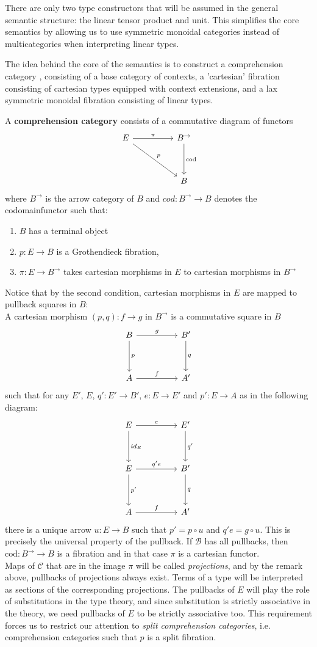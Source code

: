 There are only two type constructors that will be assumed in the general semantic structure: the linear tensor product and unit. This simplifies the core semantics by allowing us to use symmetric monoidal categories instead of multicategories when interpreting linear types.

The idea behind the core of the semantics is to construct a comprehension category \cite{jacobs}, consisting of a base category of contexts, a 'cartesian' fibration consisting of cartesian types equipped with context extensions, and a lax symmetric monoidal fibration consisting of linear types.
\begin{defn}
A \textbf{comprehension category} consists of a commutative diagram of functors
\[
\ti
E \ar[rd, "p"] \ar[r, "\pi"]  & B^{\to} \ar[d, "\text{cod}"]\\
& B
\kz
\]
where $B^\to$ is the arrow category of $B$ and $cod : B^\to \to B$ denotes the codomainfunctor such that:
\begin{enumerate}%
\item $B$ has a terminal object
\item $p : E\to B$ is a Grothendieck fibration,
\item $\pi : E\to B^\to$ takes cartesian morphisms in $E$ to cartesian morphisms in $B^\to$
\end{enumerate}
Notice that by the second condition, cartesian morphisms in $E$ are mapped to pullback squares in $B$:\\
A cartesian morphism $(p, q) : f \to g$ in $B^\to$ is a commutative square in $B$
\[
\ti
B \ar[r, "g"] \ar[d, "p"] & B' \ar[d, "q"]\\
A \ar[r,"f"] & A'
\kz
\]
such that for any $E'$, $E$, $q' : E' \to B'$, $e : E \to E'$ and $p' : E \to A$ as in the following diagram:
\[
\ti
E \ar[d, "id_E"] \ar[r, "e"] & E' \ar[d, "q'"] \\
E \ar[d, "p'"] \ar[r, "q'e"] & B' \ar[d,"q"] \\
A \ar[r, "f"] & A'
\kz
\]
there is a unique arrow $u : E \to B$ such that $p' = p \circ u$ and $q'e = g \circ u$. This is precisely the universal property of the pullback.
If $\mathcal{B}$ has all pullbacks, then $\text{cod} : B^\to \to B$ is a fibration and in that case $\pi$ is a cartesian functor.\\
Maps of $\mathcal{C}$ that are in the image $\pi$ will be called \textit{projections}, and by the remark above, pullbacks of projections always exist. Terms of a type will be interpreted as sections of the corresponding projections. The pullbacks of $E$ will play the role of substitutions in the type theory, and since substitution is strictly associative in the theory, we need pullbacks of $E$ to be strictly associative too. This requirement forces us to restrict our attention to \textit{split comprehension categories}, i.e. comprehension categories such that $p$ is a split fibration.

\end{defn}
